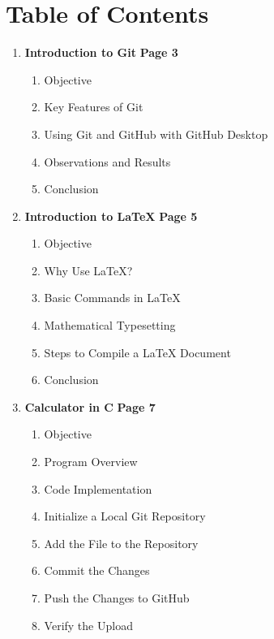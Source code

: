 \section*{Table of Contents}

\begin{enumerate}
    \item \textbf{Introduction to Git} \hfill \textbf{Page 3}
    \begin{enumerate}
        \renewcommand{\labelenumii}{\arabic{enumi}.\arabic{enumii}}
        \item Objective
        \item Key Features of Git
        \item Using Git and GitHub with GitHub Desktop
        \item Observations and Results
        \item Conclusion
    \end{enumerate}
    
    \item \textbf{Introduction to LaTeX} \hfill \textbf{Page 5}
    \begin{enumerate}
        \renewcommand{\labelenumii}{\arabic{enumi}.\arabic{enumii}}
        \item Objective
        \item Why Use LaTeX?
        \item Basic Commands in LaTeX
        \item Mathematical Typesetting
        \item Steps to Compile a LaTeX Document
        \item Conclusion
    \end{enumerate}
    
    \item \textbf{Calculator in C} \hfill \textbf{Page 7}
    \begin{enumerate}
        \renewcommand{\labelenumii}{\arabic{enumi}.\arabic{enumii}}
        \item Objective
        \item Program Overview
        \item Code Implementation
        \item Initialize a Local Git Repository
        \item Add the File to the Repository
        \item Commit the Changes
        \item Push the Changes to GitHub
        \item Verify the Upload
    \end{enumerate}
    

\end{enumerate}
